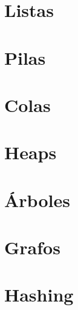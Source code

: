 \documentclass[titlepage,oneside]{book}
\begin{document}
\chapter{Listas}

\chapter{Pilas}

\chapter{Colas}

\chapter{Heaps}

\chapter{Árboles}

\chapter{Grafos}

\chapter{Hashing}

\printbibliography{}
\end{document}
